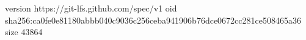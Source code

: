 version https://git-lfs.github.com/spec/v1
oid sha256:ca0fe0e81180abbb040c9036c256ceba941906b76dce0672cc281ce508465a36
size 43864
